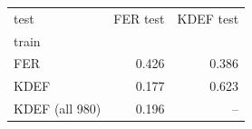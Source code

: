 \begin{tabular}{lrr}
\toprule
test & FER test & KDEF test \\
train &  &  \\
\midrule
FER & 0.426 & 0.386 \\
KDEF & 0.177 & 0.623 \\
KDEF (all 980) & 0.196 & -- \\
\bottomrule
\end{tabular}
